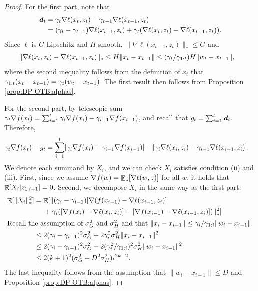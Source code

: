 \begin{proof}
For the first part, note that
\begin{align*}
    {\boldsymbol{d}}_t &= \gamma_t\nabla\ell(x_t,z_t)-\gamma_{t-1}\nabla\ell(x_{t-1},z_t) \\
    &= (\gamma_{t}-\gamma_{t-1}) \nabla\ell(x_{t-1},z_t) + \gamma_t(\nabla\ell(x_t,z_t)-\nabla\ell(x_{t-1},z_t)).
\end{align*}
Since $\ell$ is $G$-Lipschitz and $H$-smooth, $\|\nabla\ell(x_{t-1},z_t)\|_*\leq G$ and
\begin{align*}
    \|\nabla\ell(x_t,z_t)-\nabla\ell(x_{t-1},z_t)\|_* 
    &\leq H\|x_t-x_{t-1}\| \leq (\gamma_t/\gamma_{1:t})H\|w_t-x_{t-1}\|,
\end{align*}
where the second inequality follows from the definition of $x_t$ that $\gamma_{1:t}(x_t-x_{t-1})=\gamma_t(w_t-x_{t-1})$. The first result then follows from Proposition \ref{prop:DP-OTB:alphas}.

For the second part, by telescopic sum $\gamma_t\nabla f(x_t) = \sum_{i=1}^t \gamma_i\nabla f(x_i) - \gamma_{i-1}\nabla f(x_{i-1})$, and recall that $g_t=\sum_{i=1}^t {\boldsymbol{d}}_i$. Therefore,
\begin{align*}
    \gamma_t\nabla f(x_t)-g_t 
    &= \sum_{i=1}^t [\gamma_i\nabla f(x_i) - \gamma_{i-1}\nabla f(x_{i-1})] - [\gamma_i\nabla\ell(x_i,z_i)-\gamma_{i-1}\nabla\ell(x_{i-1},z_i)].
\end{align*}
We denote each summand by $X_i$, and we can check $X_i$ satisfies condition (ii) and (iii). First, since we assume $\nabla f(w) = \mathop{\mathbb{E}}_z[\nabla\ell(w,z)]$ for all $w$, it holds that $\mathop{\mathbb{E}}[X_i|z_{1:i-1}]=0$. Second, we decompose $X_i$ in the same way as the first part: 
\begin{align*}
    \mathop{\mathbb{E}}[\|X_i\|_*^2]
    &= \mathop{\mathbb{E}}[ \|(\gamma_i-\gamma_{i-1})[\nabla(f(x_{i-1})-\nabla\ell(x_{i-1},z_i)] \\
    &\quad\ + \gamma_{i}( [\nabla f(x_i)-\nabla\ell(x_i,z_i)] - [\nabla f(x_{i-1})-\nabla\ell(x_{i-1},z_i)] ) \|_*^2 ] \\
    \intertext{Recall the assumption of $\sigma_G^2$ and $\sigma_H^2$ and that $\|x_i-x_{i-1}\| \leq \gamma_i/\gamma_{1:i}\|w_i-x_{i-1}\|$.}
    &\leq 2(\gamma_i-\gamma_{i-1})^2\sigma_G^2 + 2\gamma_i^2 \sigma_H^2\|x_i-x_{i-1}\|^2 \\
    &\leq 2(\gamma_i-\gamma_{i-1})^2\sigma_G^2 + 2(\gamma_i^2/\gamma_{1:i})^2 \sigma_H^2\|w_i-x_{i-1}\|^2 \\
    &\leq 2(k+1)^2(\sigma_G^2 + D^2\sigma_H^2)i^{2k-2}.
\end{align*}
The last inequality follows from the assumption that $\|w_i-x_{i-1}\|\leq D$ and Proposition \ref{prop:DP-OTB:alphas}.


\end{proof}
